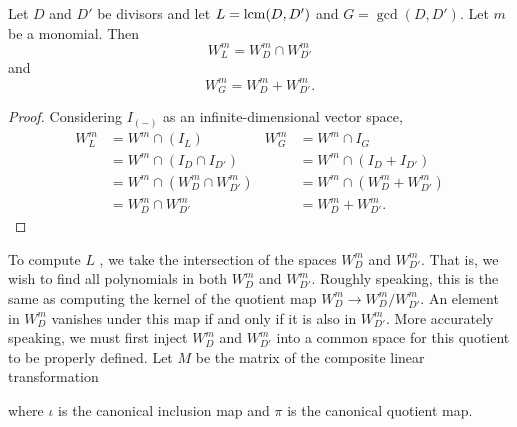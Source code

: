 \begin{proposition}
  Let $D$ and $D'$ be divisors and let $L = \operatorname{lcm}(D, D')$ and $G = \gcd(D, D')$.
  Let $m$ be a monomial. Then
    \[ W_L^m = W_D^m \cap W_{D'}^m \]
  and
    \[ W_G^m = W_D^m + W_{D'}^m. \]
\end{proposition}
\begin{proof}
  Considering $I_{(-)}$ as an infinite-dimensional vector space,
  \begin{align*}
    W_L^m &= W^m \cap (I_L)                 & W_G^m &= W^m \cap I_G \\
          &= W^m \cap (I_D \cap I_{D'})            &&= W^m \cap (I_D + I_{D'}) \\
          &= W^m \cap (W_D^m \cap W_{D'}^m)        &&= W^m \cap (W_D^m + W_{D'}^m) \\
          &= W_D^m \cap W_{D'}^m                   &&= W_D^m + W_{D'}^m.
  \end{align*}
\end{proof}

To compute $L$ , we take the intersection of the spaces $W_D^m$ and $W_{D'}^m$.
That is, we wish to find all polynomials in both $W_D^m$ and $W_{D'}^m$.
Roughly speaking, this is the same as computing the kernel of the quotient map $W_D^m \to W_D^m/W_{D'}^m$.
An element in $W_D^m$ vanishes under this map if and only if it is also in $W_{D'}^m$.
More accurately speaking, we must first inject $W_D^m$ and $W_{D'}^m$ into a common space for this quotient to be properly defined.
Let $M$ be the matrix of the composite linear transformation
\begin{center}
\end{center}
where $\iota$ is the canonical inclusion map and $\pi$ is the canonical quotient map.

